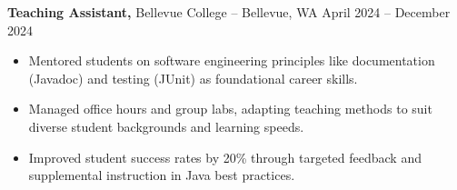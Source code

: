 \documentclass[11pt]{article}       %
\begin{document}
\textbf{Teaching Assistant,} {Bellevue College} -- Bellevue, WA \hfill April 2024 -- December 2024 \\
\vspace{-9pt}
\begin{itemize}
  \item Mentored students on software engineering principles like documentation (Javadoc) and testing (JUnit) as foundational career skills.
  \item Managed office hours and group labs, adapting teaching methods to suit diverse student backgrounds and learning speeds.
  \item Improved student success rates by 20\% through targeted feedback and supplemental instruction in Java best practices.
\end{itemize}

\end{document}
